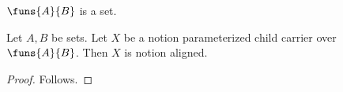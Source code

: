 

\begin{signature}\label{notion_erased_global_funs}
    $\funs{A}{B}$ is a set.
\end{signature}

\begin{proposition}\label{notion_erased_global_view_use}
    Let $A,B$ be sets.
    Let $X$ be a notion parameterized child carrier over $\funs{A}{B}$.
    Then $X$ is notion aligned.
\end{proposition}
\begin{proof}
    Follows.
\end{proof}
